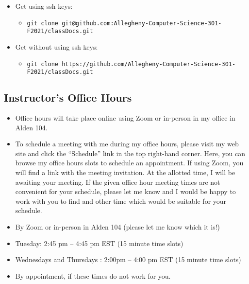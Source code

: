 \documentclass[11pt]{article} %
\begin{document}
\begin{itemize}
	\item Get using ssh keys: 
	\begin{itemize}
		\item {\tt \footnotesize git clone git@github.com:Allegheny-Computer-Science-301-F2021/classDocs.git}
	\end{itemize}

	\item Get without using ssh keys: 
	\begin{itemize}
		\item {\tt \footnotesize git clone https://github.com/Allegheny-Computer-Science-301-F2021/classDocs.git}
	\end{itemize}

\end{itemize}





\subsection*{Instructor's Office Hours}
\begin{itemize}
	\item Office hours will take place online using Zoom or in-person in my office in Alden 104. 

	\item To schedule a meeting with me during my office hours, please visit my web site and click the ``Schedule'' link in the top right-hand corner. Here, you can browse my office hours slots to schedule an appointment. If using Zoom, you will find a link with the meeting invitation. At the allotted time, I will be awaiting your meeting. If the given office hour meeting times are not convenient for your schedule, please let me know and I would be happy to work with you to find and other time which would be suitable for your schedule.
\end{itemize}

\begin{itemize}
  \itemsep 0em
  \item By Zoom or in-person in Alden 104 (please let me know which it is!)
  \item Tuesday: 2:45 pm  -- 4:45 pm EST (15 minute time slots)
  \item Wednesdays and Thursdays : 2:00pm  -- 4:00 pm EST (15 minute time slots)
  \item By appointment, if these times do not work for you.
\end{itemize}
\end{document}
